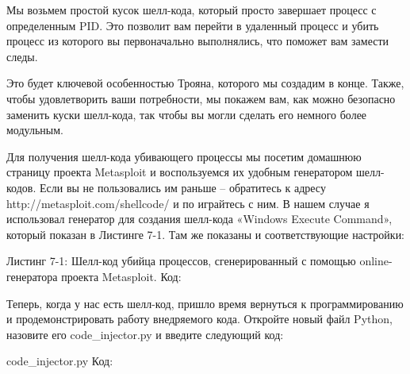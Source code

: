 \documentclass[12pt]{book}
\begin{document}
Мы возьмем простой кусок шелл-кода, который просто завершает процесс с определенным PID. Это позволит вам перейти в удаленный процесс и убить процесс из которого вы первоначально выполнялись, что поможет вам замести следы. 

Это будет ключевой особенностью Трояна, которого мы создадим в конце. Также, чтобы удовлетворить ваши потребности, мы покажем вам, как можно безопасно заменить куски шелл-кода, так чтобы вы могли сделать его немного более модульным.

Для получения шелл-кода убивающего процессы мы посетим домашнюю страницу проекта Metasploit и воспользуемся их удобным генератором шелл-кодов. Если вы не пользовались им раньше – обратитесь к адресу http://metasploit.com/shellcode/ и по играйтесь с ним. В нашем случае я использовал генератор для создания шелл-кода «Windows Execute Command», который показан в Листинге 7-1. Там же показаны и соответствующие настройки:

Листинг 7-1: Шелл-код убийца процессов, сгенерированный с помощью online-генератора проекта Metasploit.
Код:

Теперь, когда у нас есть шелл-код, пришло время вернуться к программированию и продемонстрировать работу внедряемого кода. Откройте новый файл Python, назовите его code\_injector.py и введите следующий код:

code\_injector.py
Код:


\end{document}

